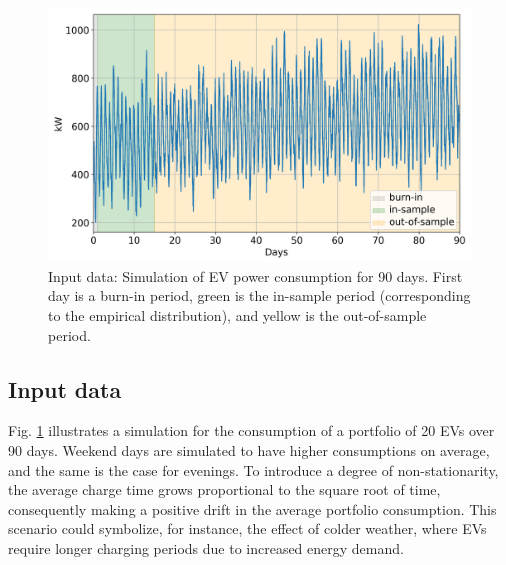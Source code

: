 \documentclass[conference]{IEEEtran}
\begin{document}


\begin{figure}[t]
    \centering
    \includegraphics[width=\columnwidth]{../figures/drjcc_raw.png}
    \caption{\small{Input data: Simulation of \ac{EV} power consumption for 90 days. First day is a burn-in period, green is the in-sample period (corresponding to the empirical distribution), and yellow is the out-of-sample period.}}
    \label{fig:drjcc_raw}
\end{figure}

\vspace{2mm}
\subsection{Input data}\label{sec:sim-setup}
\vspace{-1mm}

Fig. \ref{fig:drjcc_raw} illustrates a simulation for the consumption of a portfolio of 20 \acp{EV} over 90 days. Weekend days are simulated to have higher consumptions on average, and the same is the case for evenings. To introduce a degree of  non-stationarity, the average charge time grows proportional to the square root of time, consequently making a positive drift in the average portfolio consumption. This scenario could symbolize, for instance, the effect of colder weather, where \acp{EV} require longer charging periods due to increased energy demand.
\end{document}
